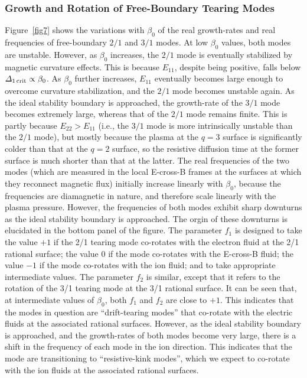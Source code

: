 \documentclass[12pt,prb,aps]{revtex4-1}
\begin{document}
\subsubsection{Growth and Rotation of Free-Boundary Tearing Modes}
Figure~\ref{fig7} shows the variations  with $\beta_0$ of the real growth-rates and real frequencies of free-boundary $2/1$ and $3/1$  modes.  At low $\beta_0$ values, both modes are
unstable. However, as $\beta_0$ increases, the $2/1$ mode is eventually stabilized by
magnetic curvature effects. This is because $E_{11}$, despite being positive, falls below ${\mit\Delta}_{1\,{\rm crit}}\propto\beta_0$.  As $\beta_0$ further increases, 
$E_{11}$ eventually becomes  large enough to overcome curvature stabilization, and the $2/1$ mode becomes unstable again. As the ideal stability
boundary is approached, the growth-rate of the $3/1$ mode becomes extremely large, whereas that of the $2/1$ mode remains finite. 
This is partly because $E_{22}>E_{11}$ (i.e., the $3/1$ mode is more intrinsically unstable than the $2/1$ mode), but mostly because
the plasma at the $q=3$ surface is significantly colder than that at the $q=2$ surface, so the resistive diffusion time at the former surface is much  shorter than
that at the latter. The real frequencies of the two modes (which are measured in the local E-cross-B frames at the surfaces at which they reconnect magnetic flux) initially increase linearly with $\beta_0$, because the frequencies are diamagnetic in nature, and therefore scale linearly with the plasma
pressure.\cite{ara} However, the frequencies of both modes exhibit sharp downturns as the ideal stability boundary is approached. The orgin
of these downturns is elucidated  in the bottom panel of the figure. 
The parameter $f_1$ is designed to take the value $+1$ if the 2/1 tearing mode co-rotates with the electron fluid at the 2/1 rational surface; the value $0$ if the mode
co-rotates with the E-cross-B fluid; the value $-1$ if the mode co-rotates with the ion fluid; and to take appropriate intermediate values. 
The parameter $f_2$ is similar, except that it refers to the rotation of the 3/1 tearing mode at the 3/1 rational surface. 
It can be seen that, 
at intermediate values of $\beta_0$,  both $f_1$ and $f_2$ are close to $+1$. This indicates that the modes in question are ``drift-tearing modes'' that co-rotate
with the electric fluids at the associated rational surfaces.\cite{ara} However, as the ideal stability boundary is approached, and the growth-rates of
both modes become very large, there is a shift in the frequency of each mode in the ion direction. This indicates that the mode are transitioning to
``resistive-kink modes'', which we expect to co-rotate with the ion fluids at the associated rational surfaces.\cite{ara}
\end{document}

